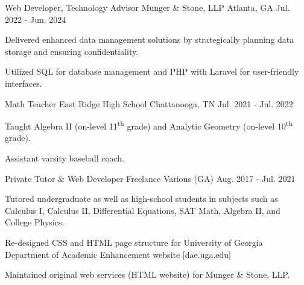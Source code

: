 

\begin{cventries}

  \cventry
    {Web Developer, Technology Advisor} %
    {Munger \& Stone, LLP} %
    {Atlanta, GA} %
    {Jul. 2022 - Jun. 2024} %
    {
    	\begin{cvitems} %
    		\item {Delivered enhanced data management solutions by strategically planning data storage and ensuring confidentiality.}
    		\item {Utilized SQL for database management and PHP with Laravel for user-friendly interfaces.}
       	\end{cvitems}
    }
    
\vspace{6mm}

  \cventry
    {Math Teacher} %
    {East Ridge High School} %
    {Chattanooga, TN} %
    {Jul. 2021 - Jul. 2022} %
    {
      \begin{cvitems} %
        \item {Taught Algebra II (on-level 11\textsuperscript{th} grade) and Analytic Geometry (on-level 10\textsuperscript{th} grade).}
        \item {Assistant varsity baseball coach.}
      \end{cvitems}
    }
    
\vspace{6mm}
	
   \cventry
	{Private Tutor \& Web Developer} %
	{Freelance} %
	{Various (GA)} %
	{Aug. 2017 - Jul. 2021} %
	{
		\begin{cvitems} %
			\item {Tutored undergraduate as well as high-school students in subjects such as Calculus I, Calculus II, Differential Equations, SAT Math, Algebra II, and College Physics.}
			\item {Re-designed CSS and HTML page structure for University of Georgia Department of Academic Enhancement website [dae.uga.edu]}
			\item {Maintained original web services (HTML website) for Munger \& Stone, LLP.}
		\end{cvitems}
	}


\end{cventries}
